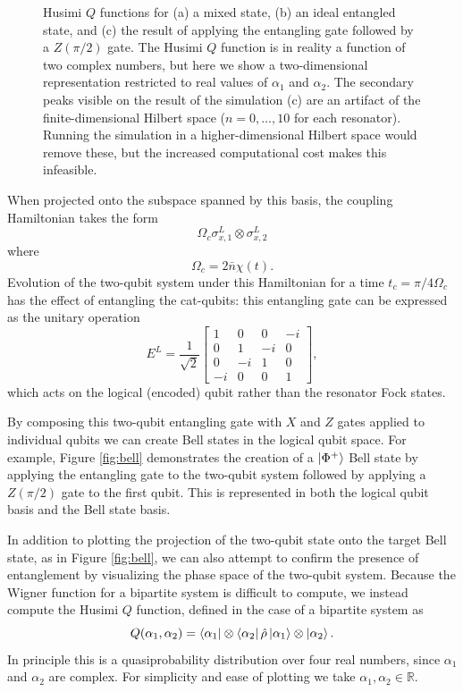 \begin{figure}[t]
\begin{subfigure}[b]{0.32\textwidth}
         \caption{}
         \label{fig:ideal_cat}
     \end{subfigure}
        \caption{Husimi $Q$ functions for (a) a mixed state, (b) an ideal entangled state, and (c) the result of applying the entangling gate followed by a $Z(\pi/2)$ gate. The Husimi $Q$ function is in reality a function of two complex numbers, but here we show a two-dimensional representation restricted to real values of $\alpha_1$ and $\alpha_2$. The secondary peaks visible on the result of the simulation (c) are an artifact of the finite-dimensional Hilbert space ($n=0,\ldots,10$ for each resonator). Running the simulation in a higher-dimensional Hilbert space would remove these, but the increased computational cost makes this infeasible.}
        \label{fig:Q}
\end{figure}

When projected onto the subspace spanned by this basis, the coupling Hamiltonian takes the form \cite{mirrahimi_2014}
\[
    \Omega_c \sigma_{x,1}^L \otimes \sigma_{x,2}^L
\]
where
\[
    \Omega_c = 2 \bar{n} \chi(t).
\]
Evolution of the two-qubit system under this Hamiltonian for a time $t_c = \pi/4\Omega_c$ has the effect of entangling the cat-qubits: this entangling gate can be expressed as the unitary operation
\[
    E^L = \frac {1} {\sqrt{2}} \begin{bmatrix}
        1 & 0 & 0 & -i \\
        0 & 1 & -i & 0 \\
        0 & -i & 1 & 0 \\
        -i & 0 & 0 & 1
    \end{bmatrix},
\]
which acts on the logical (encoded) qubit rather than the resonator Fock states.

By composing this two-qubit entangling gate with $X$ and $Z$ gates applied to individual qubits we can create Bell states in the logical qubit space.
For example, Figure \ref{fig:bell} demonstrates the creation of a $\ket{\Phi^+}$ Bell state by applying the entangling gate to the two-qubit system followed by applying a $Z(\pi/2)$ gate to the first qubit.
This is represented in both the logical qubit basis and the Bell state basis.

In addition to plotting the projection of the two-qubit state onto the target Bell state, as in Figure \ref{fig:bell}, we can also attempt to confirm the presence of entanglement by visualizing the phase space of the two-qubit system.
Because the Wigner function for a bipartite system is difficult to compute, we instead compute the Husimi $Q$ function, defined in the case of a bipartite system as
\begin{equation} \label{eq:Q}
    Q(\alpha_1, \alpha_2) = \bra{\alpha_1} \otimes \bra{\alpha_2} \hat{\rho} \ket{\alpha_1} \otimes \ket{\alpha_2}.
\end{equation}
In principle this is a quasiprobability distribution over four real numbers, since $\alpha_1$ and $\alpha_2$ are complex.
For simplicity and ease of plotting we take $\alpha_1, \alpha_2 \in \mathbb{R}$.

